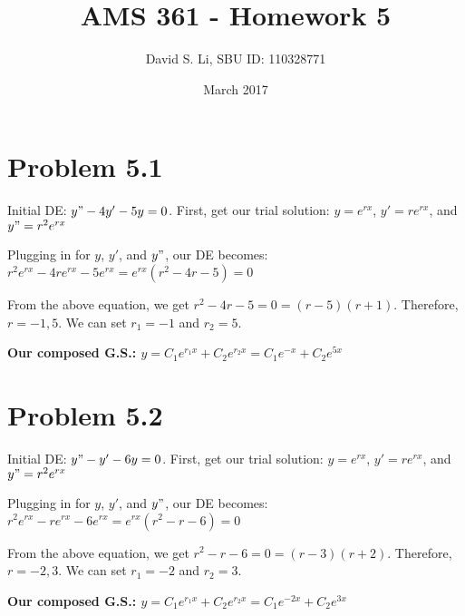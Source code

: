 \documentclass{article}
\title{AMS 361 - Homework 5}
\author{David S. Li, SBU ID: 110328771}
\date{March 2017}
\begin{document}
\maketitle

\section{Problem 5.1}

Initial DE: $y" - 4y' - 5y = 0$. First, get our trial solution: $y = e^{rx}$, $y' = re^{rx}$, and $y" = r^{2}e^{rx}$ \par

\noindent Plugging in for $y$, $y'$, and $y"$, our DE becomes: $r^{2}e^{rx} - 4re^{rx} - 5e^{rx} = e^{rx}(r^{2} - 4r - 5) = 0$ \par\vspace{0.25cm}

\noindent From the above equation, we get $r^{2} - 4r - 5 = 0 = (r - 5)(r + 1)$.  Therefore, $r = {-1, 5}$.  We can set $r_{1} = -1$ and $r_{2} = 5$. \par\vspace{0.25cm}

\noindent \textbf{Our composed G.S.: $y = C_{1}e^{r_{1}x} + C_{2}e^{r_{2}x} = C_{1}e^{-x} + C_{2}e^{5x}$}


\section{Problem 5.2}

Initial DE: $y" - y' - 6y = 0$. First, get our trial solution: $y = e^{rx}$, $y' = re^{rx}$, and $y" = r^{2}e^{rx}$ \par

\noindent Plugging in for $y$, $y'$, and $y"$, our DE becomes: $r^{2}e^{rx} - re^{rx} - 6e^{rx} = e^{rx}(r^{2} - r - 6) = 0$ \par\vspace{0.25cm}

\noindent From the above equation, we get $r^{2} - r - 6 = 0 = (r - 3)(r + 2)$.  Therefore, $r = {-2, 3}$.  We can set $r_{1} = -2$ and $r_{2} = 3$. \par\vspace{0.25cm}

\noindent \textbf{Our composed G.S.: $y = C_{1}e^{r_{1}x} + C_{2}e^{r_{2}x} = C_{1}e^{-2x} + C_{2}e^{3x}$}

\end{document}
